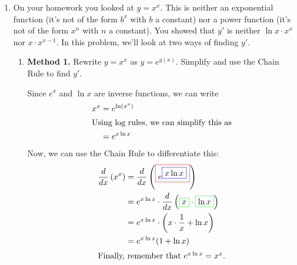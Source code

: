 \documentclass[main]{subfiles}
\begin{document}
\begin{enumerate}
\item  On your homework you looked at $y= x^x$.  This is
  neither an exponential function (it's not of the form $b^x$ with $b$ a
  constant) nor a power function (it's not of the form $x^n$ with $n$ a
  constant).  You showed that $y'$ is
  neither $\ln x \cdot x^x$ nor $x \cdot x^{x-1}$.  In this problem, we'll
  look at two ways of finding $y'$. 

  \begin{enumerate}
  \item


    \begin{problem}[\stretch{2}]
      \textbf{Method 1.}  Rewrite $y = x^x$ as
      $y=e^{g(x)}$. Simplify and use the Chain Rule to find
      $y'$.
    \end{problem}

    \begin{solution}
      Since $e^x$ and $\ln x$ are inverse functions, we can write
      \begin{align*}
        x^x &= e^{\ln (x^x)} \\
        \intertext{Using log rules, we can simplify this as} &= e^{x \ln
          x}
      \end{align*}
      Now, we can use the Chain Rule to differentiate this:
      \begin{align*}
        \frac{d}{dx} \left( x^x \right) &= \frac{d}{dx}
        \left(\fcolorbox{red}{white}{$\displaystyle e^ {
              \fcolorbox{blue}{white}{$\displaystyle x \ln x$}}
            $}\right) \\
        &= e^ { x \ln x} \cdot \frac{d}{dx}
        \left(\fcolorbox{green}{white}{$\displaystyle x$}\cdot
          \fcolorbox{green}{white}{$\displaystyle  \ln x$}\right) \\
        &= e^ { x \ln x} \cdot \left(x\cdot
          \frac{1}{x}+ \ln x\right) \\
        &= e^{x \ln x} (1 + \ln x) \\
        \intertext{Finally, remember that $e^{x \ln x} = x^x$.}
      \end{align*} 
    \end{solution}


\end{enumerate}
\end{enumerate}
\end{document}
